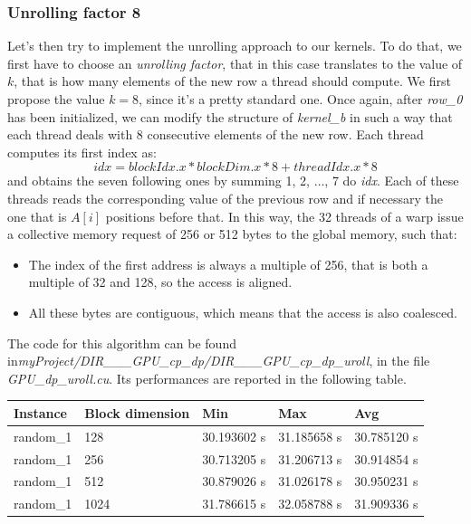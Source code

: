 \documentclass[12pt]{extarticle}
\begin{document}
\subsubsection{Unrolling factor 8}
Let's then try to implement the unrolling approach to our kernels. To do that, we first have to choose an \emph{unrolling factor}, that in this case translates to the value of $k$, that is how many elements of the new row a thread should compute. We first propose the value $k = 8$, since it's a pretty standard one.\newline
Once again, after \emph{row\_0} has been initialized, we can modify the structure of \emph{kernel\_b} in such a way that each thread deals with 8 consecutive elements of the new row.\newline
Each thread computes its first index as:
\[idx = blockIdx.x * blockDim.x * 8 + threadIdx.x * 8 \]
and obtains the seven following ones by summing 1, 2, $\dots$, 7 do \emph{idx}. Each of these threads reads the corresponding value of the previous row and if necessary the one that is $A[i]$ positions before that. In this way, the 32 threads of a warp issue a collective memory request of 256 or 512 bytes to the global memory, such that:
\begin{itemize}
    \item The index of the first address is always a multiple of 256, that is both a multiple of 32 and 128, so the access is aligned.
    \item All these bytes are contiguous, which means that the access is also coalesced.
\end{itemize}
The code for this algorithm can be found in\newline \emph{myProject/DIR\_\_\_GPU\_cp\_dp/DIR\_\_\_GPU\_cp\_dp\_uroll}, in the file \emph{GPU\_dp\_uroll.cu}.\newline
Its performances are reported in the following table.
\begin{center}
\begin{tabular}{ | m{2.2cm} | m{3.2cm} | m{2.2cm} | m{2.2cm} | m{2.2cm} |}
 \hline
 Instance & Block dimension & Min & Max & Avg\\
 \hline
 random\_1 & 128 & 30.193602 s & 31.185658 s & 30.785120 s\\
 \hline
 random\_1 & 256 & 30.713205 s & 31.206713 s & 30.914854 s\\
 \hline
 random\_1 & 512 & 30.879026 s & 31.026178 s & 30.950231 s\\
 \hline
 random\_1 & 1024 & 31.786615 s & 32.058788 s & 31.909336 s\\
 \hline
 \end{tabular}
 \end{center}
\end{document}
